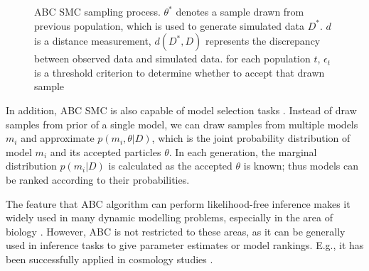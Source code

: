 \begin{figure}[t]
    \begin{center}
    \end{center}

    \caption[ABC SMC sampling process]%
    {ABC SMC sampling process. $\theta^*$ denotes a sample drawn from previous population, which is used to generate simulated data $D^*$. $d$ is a distance measurement, $d(D^*,D)$ represents the discrepancy between observed data and simulated data. for each population $t$, $\epsilon_t$ is a threshold criterion to determine whether to accept that drawn sample}
    \label{fig:smc}

\end{figure}

In addition, ABC SMC is also capable of model selection tasks \cite{model_compare}. Instead of draw samples from prior of a single model, we can draw samples from multiple models $m_i$ and approximate $p(m_i, \theta|D)$, which is the joint probability distribution of model $m_i$ and its accepted particles $\theta$. In each generation, the marginal distribution $p(m_i|D)$ is calculated as the accepted ${\theta}$ is known; thus models can be ranked according to their probabilities.

The feature that ABC algorithm can perform likelihood-free inference makes it widely used in many dynamic modelling problems, especially in the area of biology \cite{ref:abcsysbio, ref:disease, ref:compare}. However, ABC is not restricted to these areas, as it can be generally used in inference tasks to give parameter estimates or model rankings. E.g., it has been successfully applied in cosmology studies \cite{cosmology}.



